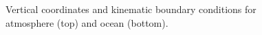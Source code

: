 \begin{figure}
  \begin{center}
  \end{center}
\caption{Vertical coordinates and kinematic boundary conditions
for atmosphere (top) and ocean (bottom).}
\label{fig:zandp-vert-coord}
\end{figure}

